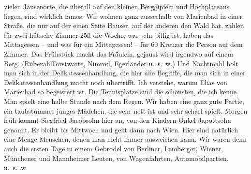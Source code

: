 \begin{ledgroupsized}[t]{13cm}
               vielen Jausenorte, die überall auf den kleinen Berggipfeln und Hochplateaus liegen,
               sind wirklich famos. Wir wohnen ganz ausserhalb von Marienbad in einer Straße, die nur auf der einen Seite Häuser, auf der
               anderen den Wald hat, zahlen für zwei hübsche Zimmer 25fl die Woche, was sehr billig
               ist, haben das Mittagessen – und was für ein Mittagessen! – für 60 Kreuzer die Person
               auf dem Zimmer. Das Frühstück macht das Fräulein, gejaust wird irgendwo auf einem
               Berg. (RübezahlForstwarte, Nimrod, Egerländer
               u. s. w.) Und Nachtmahl holt man sich in der Delikatessenhandlung, die hier
               alle Begriffe, die man sich in einer Delikatessenhandlung macht noch übertrifft. Ich
               verstehe, warum Elias von Marienbad so begeistert {\pb}ist. Die Tennisplätze sind die schönsten, die ich kenne. Man spielt eine halbe
               Stunde nach dem Regen. Wir haben eine ganz gute Partie, ein taubstummes junges Mädchen, die sehr nett ist
               und sehr scharf spielt. Morgen früh kommt Siegfried
                  Jacobsohn hier an, von den Kindern Onkel Japottsohn genannt. Er bleibt bis Mittwoch und geht dann nach Wien. Hier sind natürlich eine Menge Menschen,
               denen man nicht immer ausweichen kann. Wir waren denn auch die ersten Tage in einem
               Gebrodel von Berliner, Lemberger, Wiener, Münchener und Mannheimer Leuten, von Wagenfahrten, Automobilpartien, u. s. w.

\end{ledgroupsized}
